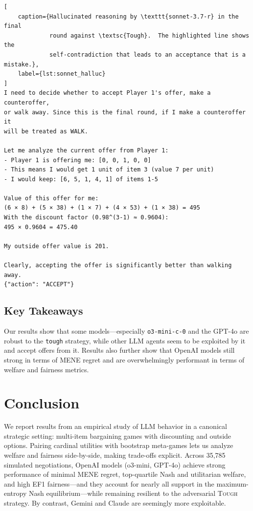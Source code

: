 \documentclass{article}
\theoremstyle{plain}
\theoremstyle{definition}
\theoremstyle{remark}
\begin{document}
\begin{lstlisting}[
    caption={Hallucinated reasoning by \texttt{sonnet-3.7-r} in the final
             round against \textsc{Tough}.  The highlighted line shows the
             self-contradiction that leads to an acceptance that is a mistake.},
    label={lst:sonnet_halluc}
]
I need to decide whether to accept Player 1's offer, make a counteroffer,
or walk away. Since this is the final round, if I make a counteroffer it
will be treated as WALK.

Let me analyze the current offer from Player 1:
- Player 1 is offering me: [0, 0, 1, 0, 0]   
- This means I would get 1 unit of item 3 (value 7 per unit)
- I would keep: [6, 5, 1, 4, 1] of items 1-5  

Value of this offer for me:
(6 × 8) + (5 × 38) + (1 × 7) + (4 × 53) + (1 × 38) = 495
With the discount factor (0.98^(3-1) ≈ 0.9604):
495 × 0.9604 = 475.40

My outside offer value is 201.

Clearly, accepting the offer is significantly better than walking away.
{"action": "ACCEPT"}
\end{lstlisting}
\subsection{Key Takeaways}
Our results show that some models—especially \texttt{o3-mini-c-0} and the GPT-4o are robust to the \texttt{tough} strategy, while other LLM agents seem to be exploited by it and accept offers from it. Results also further show that OpenAI models still strong in terms of MENE regret and are overwhelmingly performant in terms of welfare and fairness metrics. 
\section{Conclusion}

We report results from an empirical study of LLM behavior in
a canonical strategic setting: multi-item bargaining games with discounting and outside
options.  
Pairing cardinal utilities with bootstrap meta-games lets us
analyze welfare and fairness side-by-side, making 
trade-offs explicit.  
Across 35,785 simulated negotiations,
OpenAI models (o3-mini, GPT-4o) achieve strong performance of
minimal MENE regret, top-quartile Nash and utilitarian welfare, and high EF1 fairness—and they account for nearly all support in the maximum-entropy Nash equilibrium—while remaining resilient to the adversarial \textsc{Tough} strategy.  
By contrast, Gemini and Claude are seemingly more exploitable.
\end{document}
